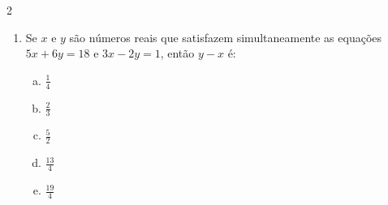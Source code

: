 \documentclass[a4paper,14pt]{article}
\begin{document}
\begin{multicols}{2}
\begin{enumerate}
\begin{enumerate}[a)]
	            \item $\begin{cases}
	            	-u + 3v = 1 \\
	            	3u - v = 5
	            \end{cases}$\\\\\\\\\\\\\\\\\\\\\\\\\\\\\\\\\\\\
		    \end{enumerate}
	    \item Se $x$ e $y$ são números reais que satisfazem simultaneamente as equações $5x + 6y = 18$ e $3x - 2y = 1$, então $y - x$ é:
	        \begin{enumerate}[a)]
	        	\item $\frac{1}{4}$
	        	\item $\frac{2}{3}$
	        	\item $\frac{5}{2}$
	        	\item $\frac{13}{4}$
	        	\item $\frac{19}{4}$\\\\\\\\\\\\\\\\\\\\\\\\\\\\\\\\\\\\\\\\\\\\\\\\\\\\\\

\end{enumerate}
\end{enumerate}
\end{multicols}
\end{document}
